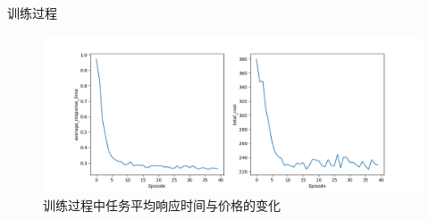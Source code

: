 \begin{frame}{训练过程}

    \begin{figure}
        \centering
        \includegraphics[height=0.7\textheight]{pics/training_track.png}
        \caption{训练过程中任务平均响应时间与价格的变化}
    \end{figure}

\end{frame}

